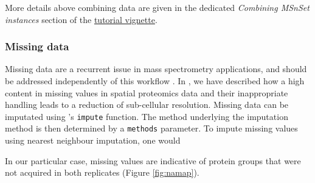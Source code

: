 More details above combining data are given in the dedicated
\textit{Combining MSnSet instances} section of the 
\href{http://bioconductor.org/packages/release/bioc/vignettes/MSnbase/inst/doc/MSnbase-demo.pdf}{tutorial
  vignette}.

\subsubsection*{Missing data}

Missing data are a recurrent issue in mass spectrometry applications,
and should be addressed independently of this workflow
\cite{Webb-Robertson:2015,Lazar:2016}. In \cite{Gatto:2014b}, we have
described how a high content in missing values in spatial proteomics
data and their inappropriate handling leads to a reduction of
sub-cellular resolution. Missing data can be imputated using
's \texttt{impute} function. The method underlying
the imputation method is then determined by a \texttt{methods}
parameter. To impute missing values using nearest neighbour
imputation, one would

\begin{knitrout}
\color{fgcolor}\begin{kframe}
\begin{alltt}
 \hlkwb{<-}   \hlstd{=} \hlstd{)}
\end{alltt}
\end{kframe}
\end{knitrout}

In our particular case, missing values are indicative of protein
groups that were not acquired in both replicates (Figure
\ref{fig:namap}).

